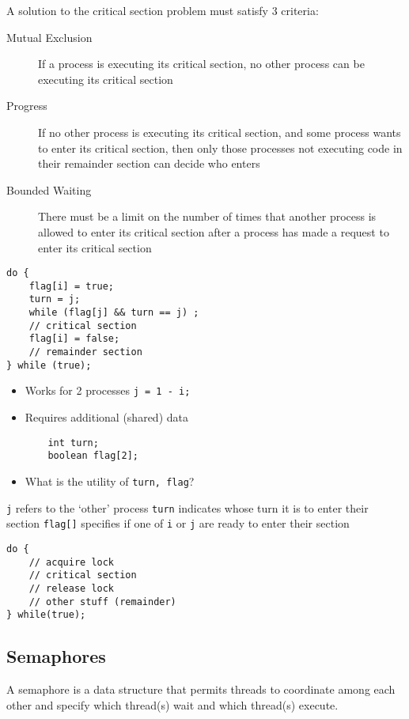 \documentclass{article}
\begin{document}
A solution to the critical section problem must satisfy 3 criteria:

\begin{description}
    \item[Mutual Exclusion] If a process is executing its critical section, no other process can be executing its critical section
    \item[Progress] If no other process is executing its critical section, and some process wants to enter its critical section, then only those processes not executing code in their remainder section can decide who enters
    \item[Bounded Waiting] There must be a limit on the number of times that another process is allowed to enter its critical section after a process has made a request to enter its critical section
\end{description}

\begin{verbatim}
do {
    flag[i] = true;
    turn = j;
    while (flag[j] && turn == j) ;
    // critical section
    flag[i] = false;
    // remainder section
} while (true);
\end{verbatim}
\begin{itemize}
    \item Works for 2 processes \texttt{j = 1 - i;}
    \item Requires additional (shared) data
          \begin{verbatim}
    int turn;
    boolean flag[2];
    \end{verbatim}
    \item What is the utility of \texttt{turn, flag}?
\end{itemize}

\texttt{j} refers to the `other' process
\texttt{turn} indicates whose turn it is to enter their section
\texttt{flag[]} specifies if one of \texttt{i} or \texttt{j} are ready to enter their section

\begin{verbatim}
do {
    // acquire lock
    // critical section
    // release lock
    // other stuff (remainder)
} while(true);
\end{verbatim}

\subsection*{Semaphores}
A semaphore is a data structure that permits threads to coordinate among each
other and specify which thread(s) wait and which thread(s) execute.
\end{document}
